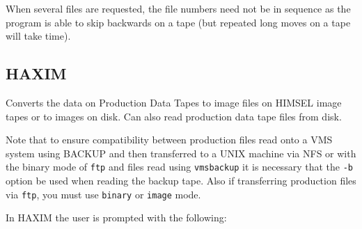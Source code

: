 When several files are requested, the file numbers need not be in
sequence as the program is able to skip backwards on a tape (but
repeated long moves on a tape will take time).
      
\subsection{HAXIM}
\label{HAXIM}

Converts the data on Production Data Tapes to image files on HIMSEL
image tapes or to images on disk.  Can also read production data tape
files from disk.

Note that to ensure compatibility between production files read onto a
VMS system using BACKUP and then transferred to a UNIX machine via NFS
or with the binary mode of \verb!ftp! and files read using
\verb!vmsbackup! it is necessary that the \verb!-b! option be used when
reading the backup tape. Also if transferring production files via
\verb!ftp!, you must use \verb!binary! or \verb!image! mode.

In HAXIM the user is prompted with the following:

